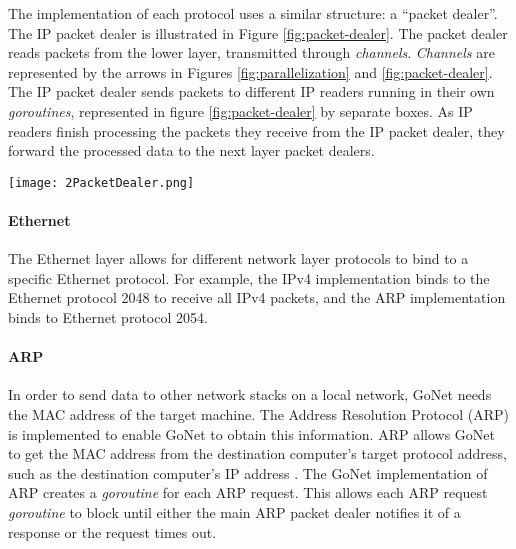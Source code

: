 \documentclass[twocolumn,10pt]{article}
\begin{document}
The implementation of each protocol uses a similar structure: a ``packet dealer''. The IP packet dealer is illustrated in Figure \ref{fig:packet-dealer}. The packet dealer reads packets from the lower layer, transmitted through \textit{channels}. \textit{Channels} are represented by the arrows in Figures \ref{fig:parallelization} and \ref{fig:packet-dealer}. The IP packet dealer sends packets to different IP readers running in their own \textit{goroutines}, represented in figure \ref{fig:packet-dealer} by separate boxes. As IP readers finish processing the packets they receive from the IP packet dealer, they forward the processed data to the next layer packet dealers.

\begin{figure*}
\begin{center}
  \texttt{[image: 2PacketDealer.png]}
  \caption{This flowchart shows the design of the IPv4 protocol packet dealer. Each box represents a \textit{goroutine}, and each black arrow represents a \textit{channel}. The IPv4 packet dealer reads packets from the output \textit{channel} of the Ethernet layer and forwards these packets to the correct IP Reader using \textit{channels}. The packets are processed by the IP readers and are then forwarded to the packet dealer of the protocol above.}
  \label{fig:packet-dealer}
\end{center}
\end{figure*}

\paragraph{Ethernet}
The Ethernet layer allows for different network layer protocols to bind to a specific Ethernet protocol. For example, the IPv4 implementation binds to the Ethernet protocol 2048 to receive all IPv4 packets, and the ARP implementation binds to Ethernet protocol 2054.

\paragraph{ARP}
In order to send data to other network stacks on a local network, GoNet needs the MAC address of the target machine. The Address Resolution Protocol (ARP) is implemented to enable GoNet to obtain this information.
ARP allows GoNet to get the MAC address from the destination computer's target protocol address, such as the destination computer's IP address \cite{ARPRFC}. The GoNet implementation of ARP creates a \textit{goroutine} for each ARP request. This allows each ARP request \textit{goroutine} to block until either the main ARP packet dealer notifies it of a response or the request times out. 
\end{document}
